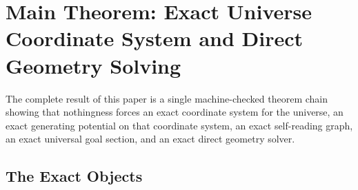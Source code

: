 
\section{Main Theorem: Exact Universe Coordinate System and Direct Geometry Solving}
\label{sec:main-theorem}

The complete result of this paper is a single machine-checked theorem chain
showing that nothingness forces an exact coordinate system for the universe,
an exact generating potential on that coordinate system, an exact self-reading
graph, an exact universal goal section, and an exact direct geometry solver.

\subsection{The Exact Objects}

